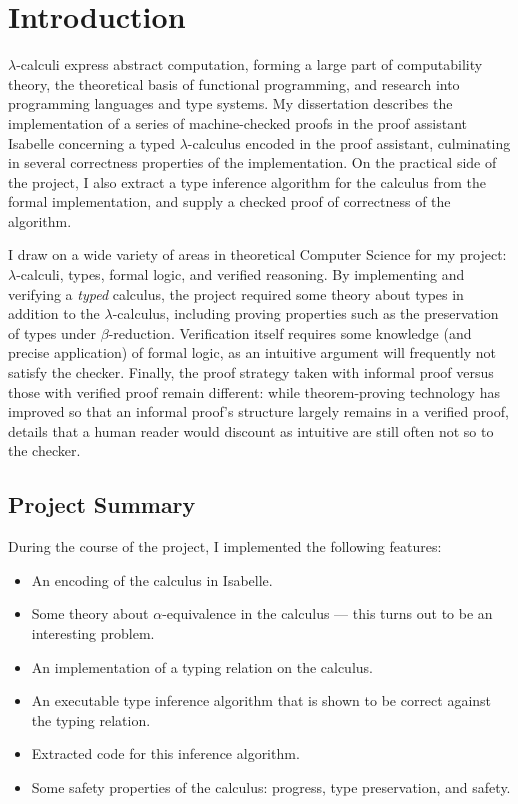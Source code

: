 \chapter{Introduction}
\(\lambda\)-calculi express abstract computation, forming a large part of computability theory, the theoretical basis of functional programming, and research into programming languages and type systems.
My dissertation describes the implementation of a series of machine-checked proofs in the proof assistant Isabelle concerning a typed \(\lambda\)-calculus encoded in the proof assistant, culminating in several correctness properties of the implementation.
On the practical side of the project, I also extract a type inference algorithm for the calculus from the formal implementation, and supply a checked proof of correctness of the algorithm.

I draw on a wide variety of areas in theoretical Computer Science for my project: \(\lambda\)-calculi, types, formal logic, and verified reasoning.
By implementing and verifying a \emph{typed} calculus, the project required some theory about types in addition to the \(\lambda\)-calculus, including proving properties such as the preservation of types under \(\beta\)-reduction.
Verification itself requires some knowledge (and precise application) of formal logic, as an intuitive argument will frequently not satisfy the checker.
Finally, the proof strategy taken with informal proof versus those with verified proof remain different: while theorem-proving technology has improved so that an informal proof's structure largely remains in a verified proof, details that a human reader would discount as intuitive are still often not so to the checker.

\section{Project Summary}
During the course of the project, I implemented the following features:
\begin{itemize}
\item
An encoding of the calculus in Isabelle.
\item
Some theory about \(\alpha\)-equivalence in the calculus --- this turns out to be an interesting problem.
\item
An implementation of a typing relation on the calculus.
\item
An executable type inference algorithm that is shown to be correct against the typing relation.
\item
Extracted code for this inference algorithm.
\item
Some safety properties of the calculus: progress, type preservation, and safety.
\end{itemize}


